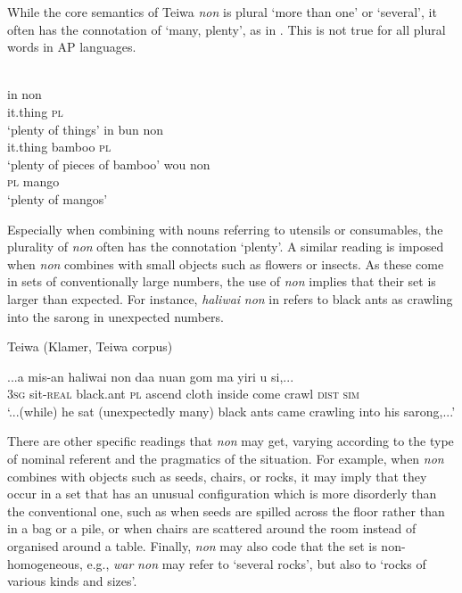 While the core semantics of Teiwa \textit{non} is plural `more than one' or `several', it often has the connotation of `many, plenty', as in . This is not true for all plural words in AP languages.


\ea%
\label{ex:9:73}
 \\
\ea
\gll  in  non\\
   it.thing  \textsc{pl} \\
   \glt `plenty of things' 
\ex
\gll in  bun non \\
it.thing bamboo \textsc{pl} \\
\glt `plenty of pieces of bamboo'
\ex 
\gll wou  non\\
\textsc{pl} mango\\
\glt  `plenty of mangos'
\z
\z

Especially when combining with nouns referring to utensils or consumables, the plurality of \textit{non} often has the connotation `plenty'. A similar reading is imposed when \textit{non} combines with small objects such as flowers or insects. As these come in sets of conventionally large numbers, the use of \textit{non} implies that their set is larger than expected. For instance, \textit{haliwai} \textit{non} in  refers to black ants as crawling into the sarong in unexpected numbers.

Teiwa (Klamer, Teiwa corpus)

\ea%
\label{ex:9:74}
\gll ...a mis-an haliwai non daa nuan gom ma yiri  u si,... \\
  \textsc{3sg} sit-\textsc{real} black.ant \textsc{pl} ascend cloth inside come crawl \textsc{dist} \textsc{sim}  \\
\glt `...(while) he sat (unexpectedly many) black ants came crawling into his sarong,...'
\z






There are other specific readings that \textit{non} may get, varying according to the type of nominal referent and the pragmatics of the situation. For example, when \textit{non} combines with objects such as seeds, chairs, or rocks, it may imply that they occur in a set that has an unusual configuration which is more disorderly than the conventional one, such as when seeds are spilled across the floor rather than in a bag or a pile, or when chairs are scattered around the room instead of organised around a table. Finally, \textit{non} may also code that the set is non-homogeneous, e.g., \textit{war} \textit{non} may refer to `several rocks', but also to `rocks of various kinds and sizes'.

